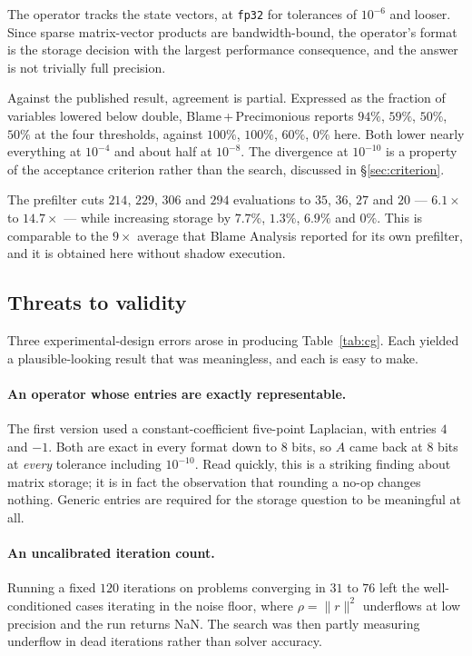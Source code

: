 \documentclass[11pt]{article}
\begin{document}
The operator tracks the state vectors, at \texttt{fp32} for tolerances of
$10^{-6}$ and looser. Since sparse matrix-vector products are bandwidth-bound,
the operator's format is the storage decision with the largest performance
consequence, and the
answer is not trivially full precision.

Against the published result, agreement is partial. Expressed as the fraction of
variables lowered below double, Blame\,+\,Precimonious reports $94\%$, $59\%$,
$50\%$, $50\%$ at the four thresholds, against $100\%$, $100\%$, $60\%$, $0\%$
here. Both lower nearly everything at $10^{-4}$ and about half at $10^{-8}$. The
divergence at $10^{-10}$ is a property of the acceptance criterion rather than
the search, discussed in \S\ref{sec:criterion}.

The prefilter cuts $214$, $229$, $306$ and $294$ evaluations to $35$, $36$, $27$
and $20$ --- $6.1\times$ to $14.7\times$ --- while increasing storage by $7.7\%$,
$1.3\%$, $6.9\%$ and $0\%$. This is comparable to the $9\times$ average that Blame
Analysis reported for its own prefilter, and it is obtained here without shadow
execution.

\subsection{Threats to validity}
\label{sec:threats}

Three experimental-design errors arose in producing Table~\ref{tab:cg}. Each
yielded a plausible-looking result that was meaningless, and each is easy to make.

\paragraph{An operator whose entries are exactly representable.} The first
version used a constant-coefficient five-point Laplacian, with entries $4$ and
$-1$. Both are exact in every format down to 8 bits, so $A$ came back at 8 bits
at \emph{every} tolerance including $10^{-10}$. Read quickly, this is a striking
finding about matrix storage; it is in fact the observation that rounding a no-op
changes nothing. Generic entries are required for the storage question to be
meaningful at all.

\paragraph{An uncalibrated iteration count.} Running a fixed $120$ iterations on
problems converging in $31$ to $76$ left the well-conditioned cases iterating in
the noise floor, where $\rho = \lVert r \rVert^2$ underflows at low precision and
the run returns NaN. The search was then partly measuring underflow in dead
iterations rather than solver accuracy.
\end{document}
